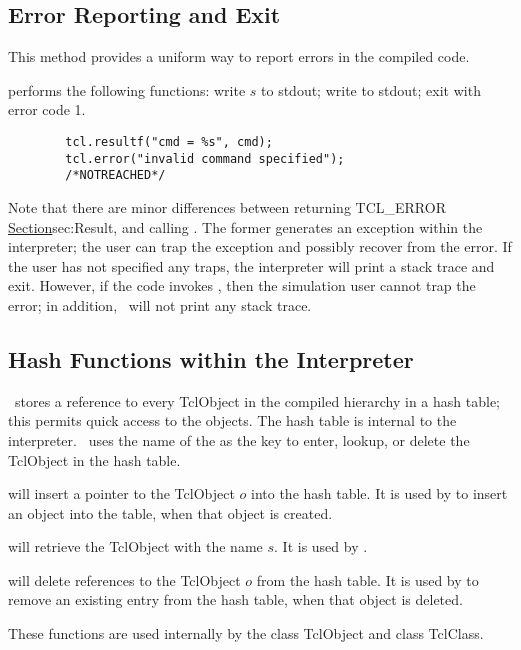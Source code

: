 \documentclass{article}
\begin{document}
\subsection{Error Reporting and Exit}
\label{sec:ErrorReporting}

This method provides a uniform way to report errors in the compiled code.
\begin{list}{\textbullet}{}
\item {}
performs the following functions:
write $s$ to stdout; write  to stdout;
exit with error code 1.
\end{list}
\begin{verbatim}
        tcl.resultf("cmd = %s", cmd);
        tcl.error("invalid command specified");
        /*NOTREACHED*/
\end{verbatim}

Note that
there are minor differences between returning TCL\_ERROR
\href{as we did in the previous subsection}{Section}{sec:Result},
and calling .
The former generates an exception within the interpreter;
the user can trap the exception and possibly recover from the error.
If the user has not specified any traps, 
the interpreter will print a stack trace and exit.
However, if the code invokes ,
then the simulation user cannot trap the error;
in addition, \ns\ will not print any stack trace.

\subsection{Hash Functions within the Interpreter}
\label{sec:HashTables}

\ns\ stores a reference to every TclObject in the compiled hierarchy
in a hash table;
this permits quick access to the objects.
The hash table is internal to the interpreter.
\ns\ uses the name of the  as the key
to enter, lookup, or delete the TclObject in the hash table.
\begin{list}{\textbullet}{}
\item {}
        will insert a pointer to the TclObject $o$ into the hash table.
        It is used by
        to insert an object into the table, when that object is created.
\item {}
        will retrieve the TclObject with the name $s$.
        It is used by
        .
\item {}
        will delete references to the TclObject $o$ from the hash table.
        It is used by
        to remove an existing entry from the hash table,
        when that object is deleted.
\end{list}
These functions are used internally by
the class TclObject and class TclClass.
\end{document}
